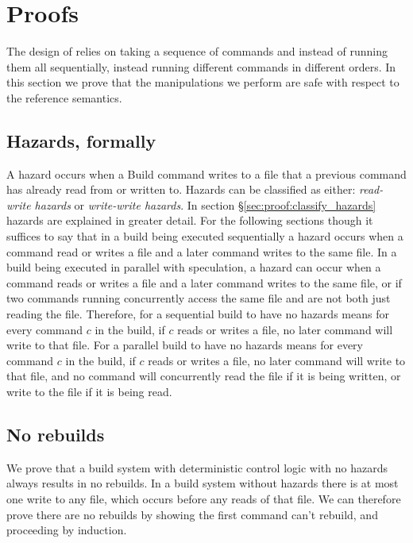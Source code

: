 \section{Proofs}
\label{sec:proof}

The design of \Rattle relies on taking a sequence of commands and instead of running them all sequentially, instead running different commands in different orders. In this section we prove that the manipulations we perform are safe with respect to the reference semantics.

\subsection{Hazards, formally}

A hazard occurs when a Build command writes to a file that a previous command has already read from or written to.  Hazards can be classified as either: \emph{read-write hazards} or \emph{write-write hazards}.  In section \S\ref{sec:proof:classify_hazards} hazards are explained in greater detail.  For the following sections though it suffices to say that in a build being executed sequentially a
hazard occurs when a command read or writes a file and a later command writes to the same file.  In a build being executed in parallel with speculation, a hazard can occur when a command reads or writes a file and a later command writes to the same file, or if two commands running concurrently access the same file and are not both just reading the file.  Therefore, for a sequential \Rattle build to have no hazards means for every command $c$ in the build, if $c$ reads or writes a file, no later command will write to that file.  For a parallel \Rattle build to have no hazards means for every command $c$ in the build, if $c$ reads or writes a file, no later command will write to that file, and no command will concurrently read the file if it is being written, or write to the file if it is being read.


\subsection{No rebuilds}
\label{sec:proof:no_rebuild}

We prove that a build system with deterministic control logic with no hazards always results in no rebuilds.
In a build system without hazards there is at most one write to any file, which occurs before any reads of that file. We can therefore prove there are no rebuilds by showing the first command can't rebuild, and proceeding by induction.

